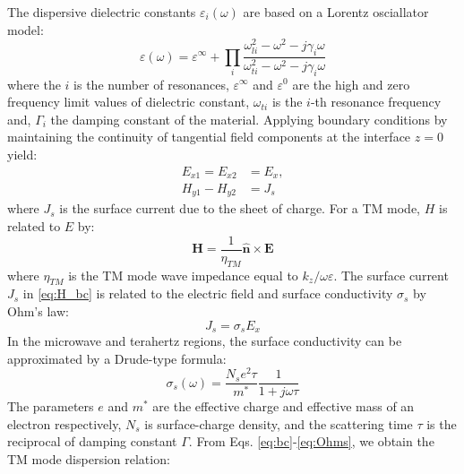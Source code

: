 \documentclass[conference, 10pt]{IEEEtran}
\renewcommand{\v}[1]{\mathbf{#1}} %
\renewcommand{\O}{\omega}  %
\newcommand{\E}{\varepsilon}  %
\renewcommand{\inf}{\infty}  %
\renewcommand{\^}{\hat}  %
\begin{document}
%
The dispersive dielectric constants $\E_i(\O)$ are based on a Lorentz osciallator model:
%
\begin{equation}
  \E(\O) = \E^{\inf} + \prod_i\frac{\O_{li}^2 - \O^2 - j\gamma_i \O}{\O_{ti}^2 - \O^2 - j\gamma_i \O}
  \label{eq:eps}
\end{equation}
%
where the $i$ is the number of resonances, $\E^{\inf}$ and $\E^0$ are the high and zero frequency limit values of dielectric constant, $\O_{ti}$ is the $i$-th resonance frequency and, $\Gamma_{i}$ the damping constant of the material. Applying boundary conditions by maintaining the continuity of tangential field components at the interface $z = 0$ yield:
%
\begin{subequations}
  \begin{align}
    E_{x1} =  E_{x2} &= E_x,
    \label{eq:E_bc}\\
    H_{y1} - H_{y2} &= J_s
    \label{eq:H_bc}
  \end{align}
  \label{eq:bc}
\end{subequations}
%
where $J_s$ is the surface current due to the sheet of charge. For a TM mode, $H$ is related to $E$ by:
%
\begin{equation}
  \v H = \frac{1}{\eta_{TM}} \v{\^{n}} \times \v E
  \label{eq:H_TM}
\end{equation}
%
where $\eta_{TM}$ is the TM mode wave impedance equal to $k_{z}/{\O \E}$. The surface current $J_s$ in \eqref{eq:H_bc} is related to the electric field and surface conductivity $\sigma_s$ by Ohm's law:
%
\begin{equation}
  J_s = \sigma_s E_x
  \label{eq:Ohms}
\end{equation}
%
In the microwave and terahertz regions, the surface conductivity can be approximated by a Drude-type formula:
%
\begin{equation}
  \sigma_s(\O) = \frac{N_s e^2 \tau}{m^{\ast}}\frac{1}{1 + j \O \tau}
  \label{eq:conductivity}
\end{equation}
%
The parameters $e$ and $m^*$ are the effective charge and effective mass of an electron respectively, $N_s$ is  surface-charge density, and the scattering time $\tau$ is the reciprocal of damping constant $\Gamma$.
From Eqs. \eqref{eq:bc}-\eqref{eq:Ohms}, we obtain the TM mode dispersion relation:
%
\end{document}
